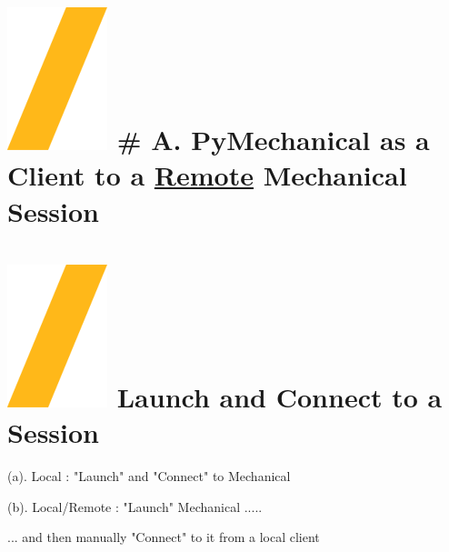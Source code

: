 \documentclass[9pt,landscape]{article}
\begin{document}
\begin{multicols}{3}
\setlength{\premulticols}{1pt}
\setlength{\postmulticols}{1pt}
\setlength{\multicolsep}{1pt}
\setlength{\columnsep}{2pt}

\vfill
\section{\includegraphics[height=\fontcharht\font`\S]{slash.png} # A. PyMechanical as a Client to a \underline{Remote} Mechanical Session}


\section{\includegraphics[height=\fontcharht\font`\S]{slash.png} Launch and Connect to a Session}

(a). Local : "Launch"  and "Connect" to Mechanical


(b). Local/Remote : "Launch" Mechanical .....


... and then  manually "Connect" to it from a local client





\end{multicols}
\end{document}
